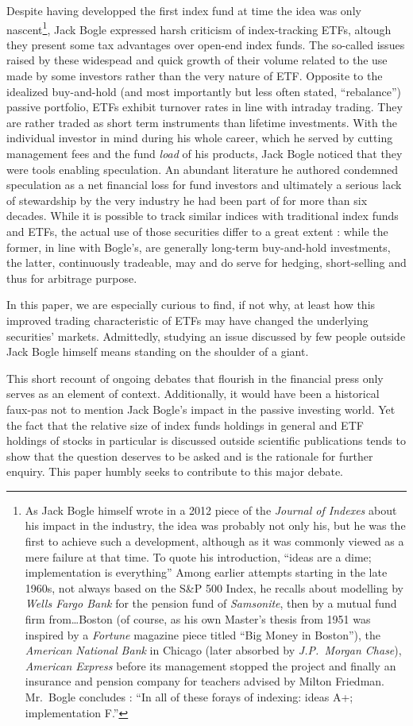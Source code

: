 Despite having developped the first index fund at time the idea was only nascent\footnote{As Jack Bogle himself wrote in a 2012 piece of the \textit{Journal of Indexes} about his impact in the industry, the idea was probably not only his, but he was the first to achieve such a development, although as it was commonly viewed as a mere failure at that time. To quote his introduction, ``ideas are a dime; implementation is everything'' Among earlier attempts starting in the late 1960s, not always based on the S\&P 500 Index, he recalls about modelling by \textit{Wells Fargo Bank} for the pension fund of \textit{Samsonite}, then by a mutual fund firm from\dots Boston (of course, as his own Master's thesis from 1951 was inspired by a \textit{Fortune} magazine piece titled ``Big Money in Boston''), the \textit{American National Bank} in Chicago (later absorbed by \textit{J.P.~Morgan Chase}), \textit{American Express} before its management stopped the project and finally an insurance and pension company for teachers advised by Milton Friedman. Mr.~Bogle concludes : ``In all of these forays of indexing: ideas A+; implementation F.''}, Jack Bogle expressed harsh criticism of index-tracking ETFs, altough they present some tax advantages over open-end index funds. The so-called issues raised by these widespead and quick growth of their volume related to the use made by some investors rather than the very nature of ETF. Opposite to the idealized buy-and-hold (and most importantly but less often stated, ``rebalance'') passive portfolio, ETFs exhibit turnover rates in line with intraday trading. They are rather traded as short term instruments than lifetime investments. With the individual investor in mind during his whole career, which he served by cutting management fees and the fund \textit{load} of his products, Jack Bogle noticed that they were tools enabling speculation. An abundant literature he authored condemned speculation as a net financial loss for fund investors and ultimately a serious lack of stewardship by the very industry he had been part of for more than six decades. While it is possible to track similar indices with traditional index funds and ETFs, the actual use of those securities differ to a great extent : while the former, in line with Bogle's, are generally long-term buy-and-hold investments, the latter, continuously tradeable, may and do serve for hedging, short-selling and thus for arbitrage purpose.

In this paper, we are especially curious to find, if not why, at least how this improved trading characteristic of ETFs may have changed the underlying securities' markets. Admittedly, studying an issue discussed by few people outside Jack Bogle himself means standing on the shoulder of a giant.

This short recount of ongoing debates that flourish in the financial press only serves as an element of context. Additionally, it would have been a historical faux-pas not to mention Jack Bogle's impact in the passive investing world. Yet the fact that the relative size of index funds holdings in general and ETF holdings of stocks in particular is discussed outside scientific publications tends to show that the question deserves to be asked and is the rationale for further enquiry. This paper humbly seeks to contribute to this major debate. 
